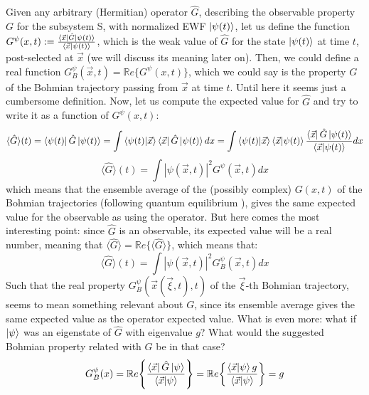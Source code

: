 \documentclass[11pt, a4paper]{article} %
\begin{document}
Given any arbitrary (Hermitian) operator $\hat{G}$, describing the observable property $G$ for the subsystem S, with normalized EWF $\ket{\psi(t)}$, let us define the function $G^{\psi}(x,t):=\frac{\bra{\vec{x}}\hat{G}\ket{\psi(t)}}{\bra{\vec{x}}\ket{\psi(t)}}$, which is the weak value of $\hat{G}$ for the state $\ket{\psi(t)}$ at time $t$, post-selected at $\vec{x}$ (we will discuss its meaning later on). Then, we could define a real function $G_B^\psi(\vec{x},t)=\mathbb{R}e\{G^{\psi}(x,t)\}$, which we could say is the property $G$ of the Bohmian trajectory passing from $\vec{x}$ at time $t$. Until here it seems just a cumbersome definition. Now, let us compute the expected value for $\hat{G}$ and try to write it as a function of $G^\psi(x,t)$:
\begin{equation}
\langle \hat{G}\rangle(t)= \bra{\psi(t)}\hat{G}\ket{\psi(t)}=\int \bra{\psi(t)} \ket{\vec{x}}\bra{\vec{x}}\hat{G}\ket{\psi(t)}dx = \int \bra{\psi(t)}\ket{\vec{x}} \bra{\vec{x}}\ket{\psi(t)}\frac{\bra{\vec{x}}\hat{G}\ket{\psi(t)}}{\bra{\vec{x}}\ket{\psi(t)}}dx
\end{equation}
\begin{equation}
\langle \hat{G}\rangle(t)= \int |\psi(\vec{x},t)|^2G^\psi(\vec{x},t)dx
\end{equation}
which means that the ensemble average of the (possibly complex) $G(x,t)$ of the Bohmian trajectories (following quantum equilibrium \cite{Absolute}), gives the same expected value for the observable as using the operator. But here comes the most interesting point: since $\hat{G}$ is an observable, its expected value will be a real number, meaning that $\langle \hat{G}\rangle=\mathbb{R}e\{\langle \hat{G}\rangle\}$, which means that:
\begin{equation}
\langle \hat{G}\rangle(t)=\int |\psi(\vec{x},t)|^2G_B^\psi(\vec{x},t)dx
\end{equation}
Such that the real property $G_B^\psi(\vec{x}(\vec{\xi},t),t)$ of the $\vec{\xi}$-th Bohmian trajectory, seems to mean something relevant about $G$, since its ensemble average gives the same expected value as the operator expected value. What is even more: what if $\ket{\psi}$ was an eigenstate of $\hat{G}$ with eigenvalue $g$? What would the suggested Bohmian property related with $G$ be in that case?
\begin{equation}
G_B^\psi(x)=\mathbb{R}e\qty{ \frac{\bra{\vec{x}}\hat{G}\ket{\psi}}{\bra{\vec{x}}\ket{\psi}} } = \mathbb{R}e\qty{ \frac{\bra{\vec{x}}\ket{\psi}g}{\bra{\vec{x}}\ket{\psi}} }=g
\end{equation}
\end{document}
